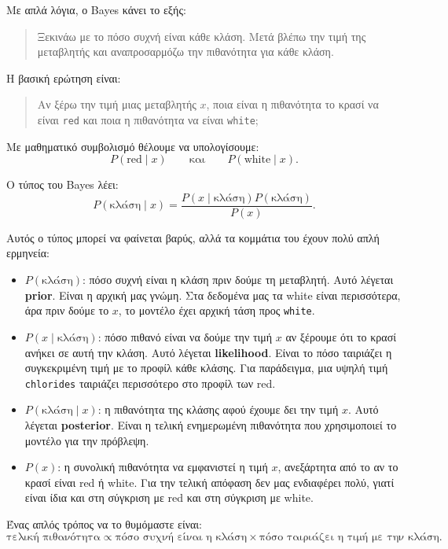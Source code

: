 \documentclass[11pt,a4paper]{article}
\newcommand{\code}[1]{\texttt{#1}}
\begin{document}
Με απλά λόγια, ο Bayes κάνει το εξής:
\begin{quote}
Ξεκινάω με το πόσο συχνή είναι κάθε κλάση. Μετά βλέπω την τιμή της
μεταβλητής και αναπροσαρμόζω την πιθανότητα για κάθε κλάση.
\end{quote}

Η βασική ερώτηση είναι:
\begin{quote}
Αν ξέρω την τιμή μιας μεταβλητής \(x\), ποια είναι η πιθανότητα το κρασί να
είναι \code{red} και ποια η πιθανότητα να είναι \code{white};
\end{quote}

Με μαθηματικό συμβολισμό θέλουμε να υπολογίσουμε:
\[
P(\text{red}\mid x)
\qquad \text{και} \qquad
P(\text{white}\mid x).
\]

Ο τύπος του Bayes λέει:
\[
P(\text{κλάση}\mid x)
=
\frac{P(x\mid \text{κλάση})P(\text{κλάση})}{P(x)}.
\]

Αυτός ο τύπος μπορεί να φαίνεται βαρύς, αλλά τα κομμάτια του έχουν πολύ απλή
ερμηνεία:
\begin{itemize}
    \item \(P(\text{κλάση})\): πόσο συχνή είναι η κλάση πριν δούμε τη μεταβλητή.
    Αυτό λέγεται \textbf{prior}. Είναι η αρχική μας γνώμη. Στα δεδομένα μας
    τα white είναι περισσότερα, άρα πριν δούμε το \(x\), το μοντέλο έχει
    αρχική τάση προς \code{white}.

    \item \(P(x\mid \text{κλάση})\): πόσο πιθανό είναι να δούμε την τιμή \(x\)
    αν ξέρουμε ότι το κρασί ανήκει σε αυτή την κλάση. Αυτό λέγεται
    \textbf{likelihood}. Είναι το πόσο ταιριάζει η συγκεκριμένη τιμή με το
    προφίλ κάθε κλάσης. Για παράδειγμα, μια υψηλή τιμή \code{chlorides}
    ταιριάζει περισσότερο στο προφίλ των red.

    \item \(P(\text{κλάση}\mid x)\): η πιθανότητα της κλάσης αφού έχουμε δει
    την τιμή \(x\). Αυτό λέγεται \textbf{posterior}. Είναι η τελική
    ενημερωμένη πιθανότητα που χρησιμοποιεί το μοντέλο για την πρόβλεψη.

    \item \(P(x)\): η συνολική πιθανότητα να εμφανιστεί η τιμή \(x\),
    ανεξάρτητα από το αν το κρασί είναι red ή white. Για την τελική απόφαση
    δεν μας ενδιαφέρει πολύ, γιατί είναι ίδια και στη σύγκριση με red και στη
    σύγκριση με white.
\end{itemize}

Ένας απλός τρόπος να το θυμόμαστε είναι:
\[
\text{τελική πιθανότητα}
\propto
\text{πόσο συχνή είναι η κλάση}
\times
\text{πόσο ταιριάζει η τιμή με την κλάση}.
\]
\end{document}
